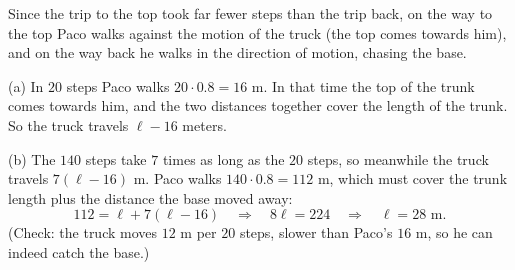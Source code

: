 Since the trip to the top took far fewer steps than the trip back, on the way to the top Paco walks against the motion of the truck (the top comes towards him), and on the way back he walks in the direction of motion, chasing the base.

(a) In $20$ steps Paco walks $20\cdot0.8=16$ m. In that time the top of the trunk comes towards him, and the two distances together cover the length of the trunk. So the truck travels $\boxed{\ell-16}$ meters.

(b) The $140$ steps take $7$ times as long as the $20$ steps, so meanwhile the truck travels $7(\ell-16)$ m. Paco walks $140\cdot0.8=112$ m, which must cover the trunk length plus the distance the base moved away:
\[
112=\ell+7(\ell-16)\quad\Longrightarrow\quad 8\ell=224\quad\Longrightarrow\quad \ell=\boxed{28}\text{ m}.
\]
(Check: the truck moves $12$ m per $20$ steps, slower than Paco's $16$ m, so he can indeed catch the base.)
